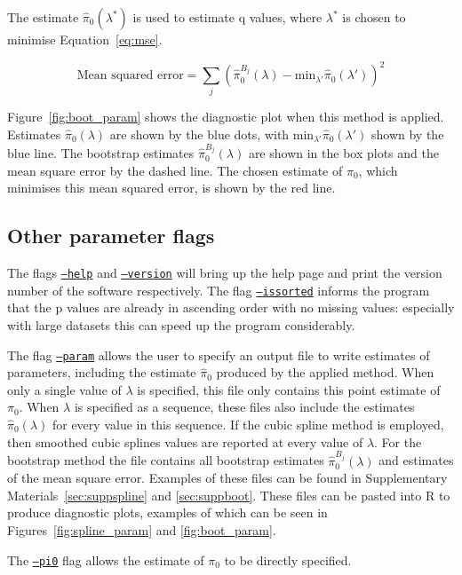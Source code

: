 \documentclass{amsart}
\begin{document}
The estimate $\hat{\pi}_0(\lambda^*)$ is used to estimate q values,  where $\lambda^*$ is chosen to minimise Equation~\ref{eq:mse}.

\begin{equation}
\text{Mean squared error} = \sum_j (\hat{\pi}^{B_j}_0(\lambda) - \text{min}_{\lambda'}\hat{\pi}_0(\lambda'))^2\label{eq:mse}
\end{equation}

Figure~\ref{fig:boot_param} shows the diagnostic plot when this method is applied. Estimates $\hat{\pi}_0(\lambda)$ are shown by the blue dots, with $\text{min}_{\lambda'}\hat{\pi}_0(\lambda')$ shown by the blue line. The bootstrap estimates $\hat{\pi}^{B_j}_0(\lambda)$ are shown in the box plots and the mean square error by the dashed line. The chosen estimate of $\pi_0$, which minimises this mean squared error, is shown by the red line.

\subsection{Other parameter flags}

The flags \underline{\texttt{--help}} and \underline{\texttt{--version}} will bring up the help page and print the version number of the software respectively. The flag \underline{\texttt{--issorted}} informs the program that the p values are already in ascending order with no missing values: especially with large datasets this can speed up the program considerably.

The flag \underline{\texttt{--param}} allows the user to specify an output file to write estimates of parameters, including the estimate $\hat{\pi}_0$ produced by the applied method. When only a single value of $\lambda$ is specified, this file only contains this point estimate of $\pi_0$. When $\lambda$ is specified as a sequence, these files also include the estimates $\hat{\pi}_0(\lambda)$ for every value in this sequence. If the cubic spline method is employed, then smoothed cubic splines values are reported at every value of $\lambda$. For the bootstrap method the file contains all bootstrap estimates $\hat{\pi}^{B_j}_0(\lambda)$ and estimates of the mean square error. Examples of these files can be found in Supplementary Materials~\ref{sec:suppspline} and \ref{sec:suppboot}. These files can be pasted into R to produce diagnostic plots, examples of which can be seen in Figures~\ref{fig:spline_param} and \ref{fig:boot_param}.

The \underline{\texttt{--pi0}} flag allows the estimate of $\pi_0$ to be directly specified.
\end{document}
